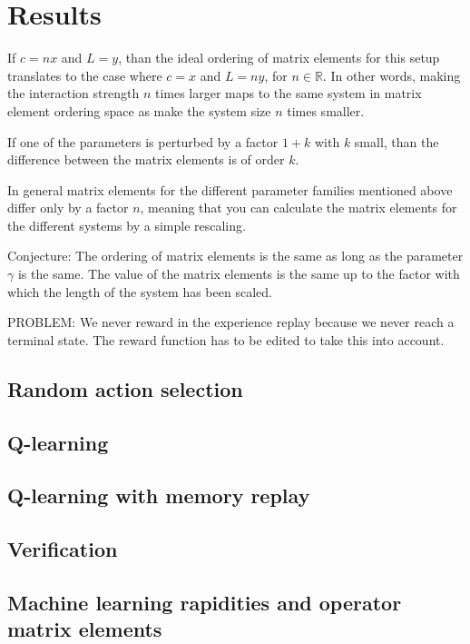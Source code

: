 \documentclass[11pt, a4paper]{report} %
\begin{document}
\section{Results}

If $c = n  x$ and $L = y$, than the ideal ordering of matrix elements for this setup translates to the case where $c = x$ and $L = n y$, for $n \in \mathbb{R}$.
In other words, making the interaction strength $n$ times larger maps to the same system in matrix element ordering space as make the system size $n$ times smaller.

If one of the parameters is perturbed by a factor $1+k$ with $k$ small, than the difference between the matrix elements is of order $k$.

In general matrix elements for the different parameter families mentioned above differ only by a factor $n$, meaning that you can calculate the matrix elements for the different systems by a simple rescaling.

Conjecture: The ordering of matrix elements is the same as long as the parameter $\gamma$ is the same. The value of the matrix elements is the same up to the factor with which the length of the system has been scaled.

PROBLEM: We never reward in the experience replay because we never reach a terminal state. The reward function has to be edited to take this into account.

\subsection{Random action selection}

\subsection{Q-learning}

\subsection{Q-learning with memory replay}

\subsection{Verification}


\subsection{Machine learning rapidities and operator matrix elements}
\end{document}
